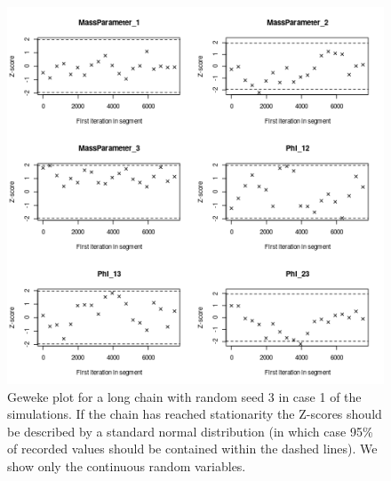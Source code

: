 \documentclass[12pt]{article} %
\begin{document}
	\newpage

	\begin{figure}[h]
			\centering
			\includegraphics[scale=0.65]{Images/Gen_data/Case_1/Geweke_plot_3.png}
			\caption{Geweke plot \cite{GewekeEvaluatingAccuracySamplingBased} for a long chain with random seed 3 in case 1 of the simulations. If the chain has reached stationarity the Z-scores should be described by a standard normal distribution (in which case 95\% of recorded values should be contained within the dashed lines). We show only the continuous random variables.}
			\label{fig:gen_data_case_1_geweke_plot_3}
		\end{figure}
		
	\newpage
	
\end{document}
